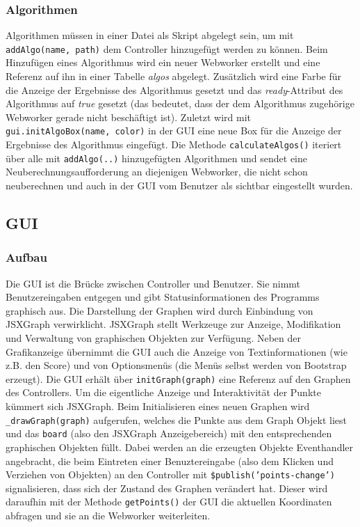 \documentclass[a4paper,twocolumn]{scrartcl}
\begin{document}
\subsubsection{Algorithmen}
Algorithmen müssen in einer Datei als Skript abgelegt sein, um mit \texttt{addAlgo(name, path)} dem Controller hinzugefügt werden zu können. Beim Hinzufügen eines Algorithmus wird ein neuer Webworker erstellt und eine Referenz auf ihn in einer Tabelle \emph{algos} abgelegt. Zusätzlich wird eine Farbe für die Anzeige der Ergebnisse des Algorithmus gesetzt und das \emph{ready}-Attribut des Algorithmus auf \emph{true} gesetzt (das bedeutet, dass der dem Algorithmus zugehörige Webworker gerade nicht beschäftigt ist). Zuletzt wird mit \texttt{gui.initAlgoBox(name, color)} in der GUI eine neue Box für die Anzeige der Ergebnisse des Algorithmus eingefügt.
Die Methode \texttt{calculateAlgos()} iteriert über alle mit \texttt{addAlgo(..)} hinzugefügten Algorithmen und sendet eine Neuberechnungsaufforderung an diejenigen Webworker, die nicht schon neuberechnen und auch in der GUI vom Benutzer als sichtbar eingestellt wurden.

\subsection{GUI}
\subsubsection{Aufbau}
Die GUI ist die Brücke zwischen Controller und Benutzer. Sie nimmt Benutzereingaben entgegen und gibt Statusinformationen des Programms graphisch aus. Die Darstellung der Graphen wird durch Einbindung von JSXGraph verwirklicht. JSXGraph stellt Werkzeuge zur Anzeige, Modifikation und Verwaltung von graphischen Objekten zur Verfügung. Neben der Grafikanzeige übernimmt die GUI auch die Anzeige von Textinformationen (wie z.B. den Score) und von Optionsmenüs (die Menüs selbst werden von Bootstrap erzeugt).
Die GUI erhält über \texttt{initGraph(graph)} eine Referenz auf den Graphen des Controllers.
Um die eigentliche Anzeige und Interaktivität der Punkte kümmert sich JSXGraph. Beim Initialisieren eines neuen Graphen wird \texttt{\_drawGraph(graph)} aufgerufen, welches die Punkte aus dem Graph Objekt liest und das \texttt{board} (also den JSXGraph Anzeigebereich) mit den entsprechenden graphischen Objekten füllt. Dabei werden an die erzeugten Objekte Eventhandler angebracht, die beim Eintreten einer Benuztereingabe (also dem Klicken und Verziehen von Objekten) an den Controller mit \texttt{\$publish('points-change')} signalisieren, dass sich der Zustand des Graphen verändert hat. Dieser wird daraufhin mit der Methode \texttt{getPoints()} der GUI die aktuellen Koordinaten abfragen und sie an die Webworker weiterleiten.
\end{document}
